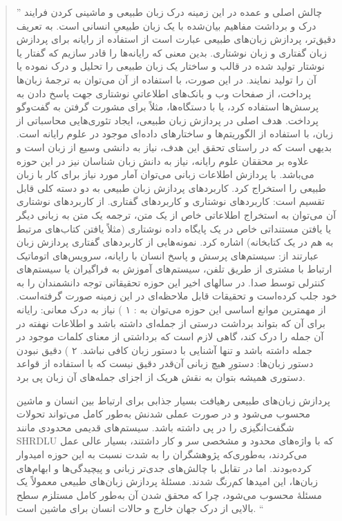 \documentclass[a4paper, 12pt]{article}
\begin{document}
	 	
	  	\begin{quote}
	  		\textquotedblright
	  		چالش اصلی و عمده در این زمینه درک زبان طبیعی و ماشینی کردن فرایند درک و برداشت مفاهیم بیان‌شده با یک زبان طبیعیِ انسانی است. به تعریف دقیق‌تر، پردازش زبان‌های طبیعی عبارت است از استفاده از رایانه برای پردازش زبان گفتاری و زبان نوشتاری. بدین معنی که رایانه‌ها را قادر سازیم که گفتار یا نوشتار تولید شده در قالب و ساختار یک زبان طبیعی را تحلیل و درک نموده یا آن را تولید نمایند. در این صورت، با استفاده از آن می‌توان به ترجمهٔ زبان‌ها پرداخت، از صفحات وب و بانک‌های اطلاعاتیِ نوشتاری جهت پاسخ دادن به پرسش‌ها استفاده کرد، یا با دستگاه‌ها، مثلاً برای مشورت گرفتن به گفت‌وگو پرداخت. هدف اصلی در پردازش زبان طبیعی، ایجاد تئوری‌هایی محاسباتی از زبان، با استفاده از الگوریتم‌ها و ساختارهای داده‌ای موجود در علوم رایانه است. بدیهی است که در راستای تحقق این هدف، نیاز به دانشی وسیع از زبان است و علاوه بر محققان علوم رایانه، نیاز به دانش زبان شناسان نیز در این حوزه می‌باشد. با پردازش اطلاعات زبانی می‌توان آمار مورد نیاز برای کار با زبان طبیعی را استخراج کرد. کاربردهای پردازش زبان طبیعی به دو دسته کلی قابل تقسیم است: کاربردهای نوشتاری و کاربردهای گفتاری. از کاربردهای نوشتاری آن می‌توان به استخراج اطلاعاتی خاص از یک متن، ترجمه یک متن به زبانی دیگر یا یافتن مستنداتی خاص در یک پایگاه داده نوشتاری (مثلاً یافتن کتاب‌های مرتبط به هم در یک کتابخانه) اشاره کرد. نمونه‌هایی از کاربردهای گفتاری پردازش زبان عبارتند از: سیستم‌های پرسش و پاسخ انسان با رایانه، سرویس‌های اتوماتیک ارتباط با مشتری از طریق تلفن، سیستم‌های آموزش به فراگیران یا سیستم‌های کنترلی توسط صدا. در سالهای اخیر این حوزه تحقیقاتی توجه دانشمندان را به خود جلب کرده‌است و تحقیقات قابل ملاحظه‌ای در این زمینه صورت گرفته‌است.
	  		از مهمترین موانع اساسی این حوزه می‌توان به :
	  		۱ ) نیاز به درک معانی: رایانه برای آن که بتواند برداشت درستی از جمله‌ای داشته باشد و اطلاعات نهفته در آن جمله را درک کند، گاهی لازم است که برداشتی از معنای کلمات موجود در جمله داشته باشد و تنها آشنایی با دستور زبان کافی نباشد. 
	  		۲ ) دقیق نبودن دستور زبان‌ها: دستورِ هیچ زبانی آن‌قدر دقیق نیست که با استفاده از قواعد دستوری همیشه بتوان به نقش هریک از اجزای جمله‌های آن زبان پی برد.
	  		
	  		پردازش زبان‌های طبیعی رهیافت بسیار جذابی برای ارتباط بین انسان و ماشین محسوب می‌شود و در صورت عملی شدنش به‌طور کامل می‌تواند تحولات شگفت‌انگیزی را در پی داشته‌ باشد. سیستم‌های قدیمی محدودی مانند SHRDLU که با واژه‌های محدود و مشخصی سر و کار داشتند، بسیار عالی عمل می‌کردند، به‌طوری‌که پژوهشگران را به شدت نسبت به این حوزه امیدوار کرده‌بودند. اما در تقابل با چالش‌های جدی‌تر زبانی و پیچیدگی‌ها و ابهام‌های زبان‌ها، این امیدها کم‌رنگ شدند. مسئلهٔ پردازش زبان‌های طبیعی معمولاً یک مسئلهٔ 
	  		محسوب می‌شود، چرا که محقق شدن آن به‌طور کامل مستلزم سطح بالایی از درک جهان خارج و حالات انسان برای ماشین است.
	  		\textquotedblleft
	  		
	  	\end{quote}
\end{document}
